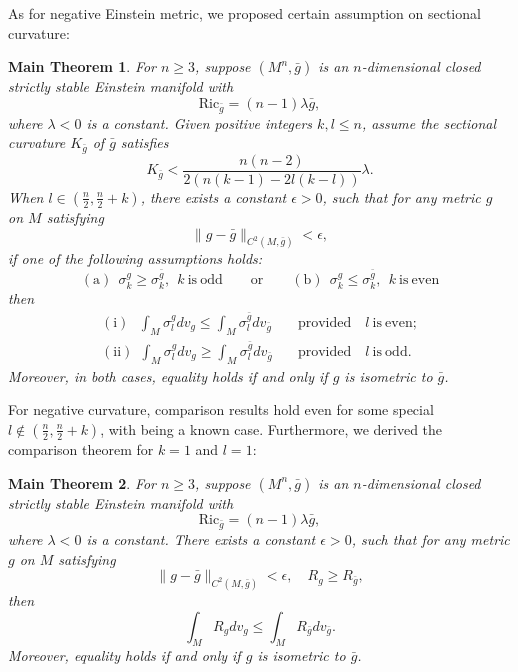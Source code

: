 \documentclass[12pt]{amsart}
\newtheorem{theorem}{Main Theorem}
\newcommand{\bg}{\bar{g}}
\numberwithin{equation}{section}
\begin{document}
As for negative Einstein metric, we proposed certain assumption on sectional curvature:

\begin{theorem}\label{theorem: main_B}
    For $n \geq 3$, suppose $(M^n,\bg)$ is an $n$-dimensional closed strictly stable Einstein manifold with
    \begin{equation*}
        \mathrm{Ric}_{\bg} = (n-1)\lambda\bg,
    \end{equation*} 
    where $\lambda < 0$ is a constant. Given positive integers $k, l \leq n$, assume the sectional curvature $K_{\bg}$ of $\bg$ satisfies
    \begin{equation*}
        K_{\bg}<\frac{n(n-2)}{2\left(n(k-1)-2l(k-l)\right)}\lambda.
    \end{equation*}
    When $l\in\left(\frac{n}{2},  \frac{n}{2}+k \right)$, there exists a constant $\epsilon>0$, such that for any metric $g$ on $M$ satisfying 
    \begin{equation*}
        \|g-\bg\|_{C^2(M,\bg)}<\epsilon,
    \end{equation*}
    if one of the following assumptions holds:
    \begin{equation*}
        \mathrm{(a)}\ \ \sigma_k^g \geq \sigma_k^{\bg}, \ \ k \ \mathrm{is\  odd}\qquad\mathrm{or}\qquad\mathrm{(b)}\ \  \sigma_k^g \leq \sigma_k^{\bg}, \ \ k \ \mathrm{is\  even}
    \end{equation*}
    then
    \begin{align*}
        \mathrm{(i)}\ \ \ \int_M\sigma_l^gdv_g\leq\int_M\sigma_l^{\bg}dv_{\bg}\quad &\mathrm{provided}\quad l\ \mathrm{is\ even;}\\
        \mathrm{(ii)}\ \ \int_M \sigma_l^gdv_g \geq \int_M\sigma_l^{\bg}dv_{\bg}\quad &\mathrm{provided}\quad l\ \mathrm{is\ odd.}
    \end{align*}
    Moreover, in both cases, equality holds if and only if $g$ is isometric to $\bg$.
\end{theorem}


For negative curvature, comparison results hold even for some special $l\notin\left(\frac{n}{2},  \frac{n}{2}+k \right)$, with  being a known case. Furthermore, we derived the comparison theorem for $k=1$ and $l=1$:

\begin{theorem}\label{theorem: main_C}
    For $n \geq 3$, suppose $(M^n,\bg)$ is an $n$-dimensional closed strictly stable Einstein manifold with\begin{equation*}
    \mathrm{Ric}_{\bg}=(n-1)\lambda\bg,
\end{equation*} 
where $\lambda < 0$ is a constant. There exists a constant $\epsilon>0$, such that for any metric $g$ on $M$ satisfying 
\begin{equation*}
    \|g-\bg\|_{C^2(M,\bg)}<\epsilon, \quad R_g\geq R_{\bg},
\end{equation*}
then
\begin{equation*}
    \int_MR_gdv_g\leq\int_MR_{\bg}dv_{\bg}.
\end{equation*}
Moreover, equality holds if and only if $g$ is isometric to $\bg$.
\end{theorem}
\end{document}
